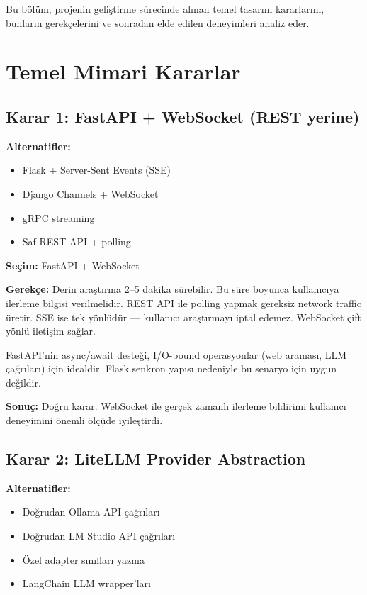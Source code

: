 
Bu b\"{o}l\"{u}m, projenin geli\c{s}tirme s\"{u}recinde al{\i}nan temel tasar{\i}m kararlar{\i}n{\i}, bunlar{\i}n gerek\c{c}elerini ve sonradan elde edilen deneyimleri analiz eder.

\section{Temel Mimari Kararlar}

\subsection{Karar 1: FastAPI + WebSocket (REST yerine)}

\textbf{Alternatifler:}
\begin{itemize}
  \item Flask + Server-Sent Events (SSE)
  \item Django Channels + WebSocket
  \item gRPC streaming
  \item Saf REST API + polling
\end{itemize}

\textbf{Se\c{c}im:} FastAPI + WebSocket

\textbf{Gerek\c{c}e:} Derin ara\c{s}t{\i}rma 2--5 dakika s\"{u}rebilir. Bu s\"{u}re boyunca kullan{\i}c{\i}ya ilerleme bilgisi verilmelidir. REST API ile polling yapmak gereksiz network traffic \"{u}retir. SSE ise tek y\"{o}nl\"{u}d\"{u}r --- kullan{\i}c{\i} ara\c{s}t{\i}rmay{\i} iptal edemez. WebSocket \c{c}ift y\"{o}nl\"{u} ileti\c{s}im sa\u{g}lar.

FastAPI'nin async/await deste\u{g}i, I/O-bound operasyonlar (web araması, LLM \c{c}a\u{g}r{\i}lar{\i}) i\c{c}in idealdir. Flask senkron yap{\i}s{\i} nedeniyle bu senaryo i\c{c}in uygun de\u{g}ildir.

\textbf{Sonu\c{c}:} Do\u{g}ru karar. WebSocket ile ger\c{c}ek zamanl{\i} ilerleme bildirimi kullan{\i}c{\i} deneyimini \"{o}nemli \"{o}l\c{c}\"{u}de iyile\c{s}tirdi.

\subsection{Karar 2: LiteLLM Provider Abstraction}

\textbf{Alternatifler:}
\begin{itemize}
  \item Do\u{g}rudan Ollama API \c{c}a\u{g}r{\i}lar{\i}
  \item Do\u{g}rudan LM Studio API \c{c}a\u{g}r{\i}lar{\i}
  \item \"{O}zel adapter s{\i}n{\i}flar{\i} yazma
  \item LangChain LLM wrapper'lar{\i}
\end{itemize}

